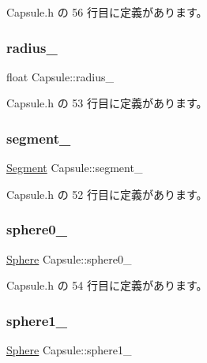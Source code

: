  Capsule.\+h の 56 行目に定義があります。

\mbox{\label{class_capsule_a5a479b152df710dba41b6529cf11199c}} 
\subsubsection{\texorpdfstring{radius\+\_\+}{radius\_}}
{\footnotesize\ttfamily float Capsule\+::radius\+\_\+}



 Capsule.\+h の 53 行目に定義があります。

\mbox{\label{class_capsule_a9557489d45b8a343f58d815965be988c}} 
\subsubsection{\texorpdfstring{segment\+\_\+}{segment\_}}
{\footnotesize\ttfamily \mbox{\hyperlink{class_segment}{Segment}} Capsule\+::segment\+\_\+}



 Capsule.\+h の 52 行目に定義があります。

\mbox{\label{class_capsule_a37c7db7fe8cb06be2f374d7aba24267e}} 
\subsubsection{\texorpdfstring{sphere0\+\_\+}{sphere0\_}}
{\footnotesize\ttfamily \mbox{\hyperlink{class_sphere}{Sphere}} Capsule\+::sphere0\+\_\+}



 Capsule.\+h の 54 行目に定義があります。

\mbox{\label{class_capsule_ac478efc95993a85908a7cd2759133ab2}} 
\subsubsection{\texorpdfstring{sphere1\+\_\+}{sphere1\_}}
{\footnotesize\ttfamily \mbox{\hyperlink{class_sphere}{Sphere}} Capsule\+::sphere1\+\_\+}



